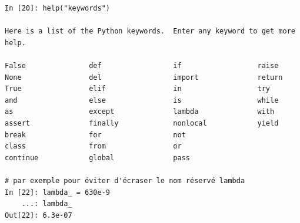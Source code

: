 \documentclass{beamer}
\begin{document}
\begin{frame}

\begin{verbatim}
In [20]: help("keywords")

Here is a list of the Python keywords.  Enter any keyword to get more help.

False               def                 if                  raise
None                del                 import              return
True                elif                in                  try
and                 else                is                  while
as                  except              lambda              with
assert              finally             nonlocal            yield
break               for                 not
class               from                or
continue            global              pass

# par exemple pour éviter d'écraser le nom réservé lambda
In [22]: lambda_ = 630e-9
    ...: lambda_
Out[22]: 6.3e-07
\end{verbatim}
\end{frame}
\end{document}
